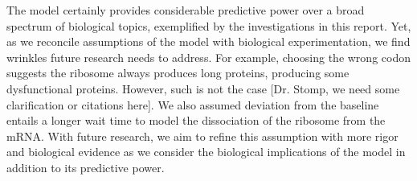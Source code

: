 \documentclass[12pt]{article}
\numberwithin{equation}{section}
\begin{document}

The model certainly provides considerable predictive power over a broad spectrum
of biological topics, exemplified by the investigations in this report.  Yet,
as we reconcile assumptions of the model with biological
experimentation, we find wrinkles future research needs to address.
For example, choosing the wrong codon suggests the ribosome always produces
long proteins, producing some dysfunctional proteins. However, such is not the case
[Dr. Stomp, we need some clarification or citations here]. We also
assumed deviation from the baseline entails a longer wait time to
model the dissociation of the ribosome from the mRNA. With future
research, we aim to refine this assumption with more rigor and
biological evidence as we consider the biological implications of the model in addition
to its predictive power.

{}
\begin{singlespace}  \end{singlespace}
\end{document}
